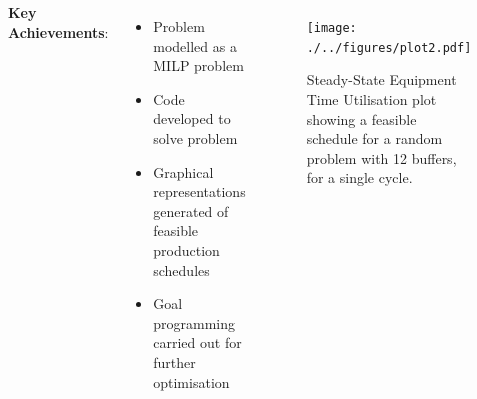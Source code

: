 \documentclass{beamer}
\begin{document}
\begin{frame}
\begin{columns}
\begin{itemize}
            \end{itemize}
            \textbf{Key Achievements}:
            \begin{itemize}
                \item Problem modelled as a MILP problem
                \item Code developed to solve problem
                \item Graphical representations generated of feasible
                    production schedules
                \item Goal programming carried out for further optimisation
            \end{itemize}
            
            \begin{figure}
                \centering
                \texttt{[image: ./../figures/plot2.pdf]}
                \captionsetup{justification=centering}
                \caption{\tiny Steady-State Equipment Time Utilisation plot
                showing a feasible schedule for a random problem with 12
                buffers, for a single cycle.}
            \end{figure}  
    \end{columns}
\end{frame}
\end{document}
